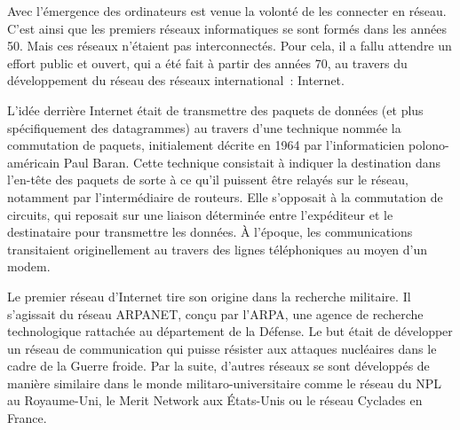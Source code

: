 Avec l'émergence des ordinateurs est venue la volonté de les connecter en réseau. C'est ainsi que les premiers réseaux informatiques se sont formés dans les années 50. Mais ces réseaux n'étaient pas interconnectés. Pour cela, il a fallu attendre un effort public et ouvert, qui a été fait à partir des années 70, au travers du développement du réseau des réseaux international~: Internet.


L'idée derrière Internet était de transmettre des paquets de données (et plus spécifiquement des datagrammes) au travers d'une technique nommée la commutation de paquets, initialement décrite en 1964 par l'informaticien polono-américain Paul Baran. Cette technique consistait à indiquer la destination dans l'en-tête des paquets de sorte à ce qu'il puissent être relayés sur le réseau, notamment par l'intermédiaire de routeurs. Elle s'opposait à la commutation de circuits, qui reposait sur une liaison déterminée entre l'expéditeur et le destinataire pour transmettre les données. À l'époque, les communications transitaient originellement au travers des lignes téléphoniques au moyen d'un modem.


Le premier réseau d'Internet tire son origine dans la recherche militaire. Il s'agissait du réseau ARPANET, conçu par l'ARPA, une agence de recherche technologique rattachée au département de la Défense. Le but était de développer un réseau de communication qui puisse résister aux attaques nucléaires dans le cadre de la Guerre froide. Par la suite, d'autres réseaux se sont développés de manière similaire dans le monde militaro-universitaire comme le réseau du NPL au Royaume-Uni, le Merit Network aux États-Unis ou le réseau Cyclades en France.

